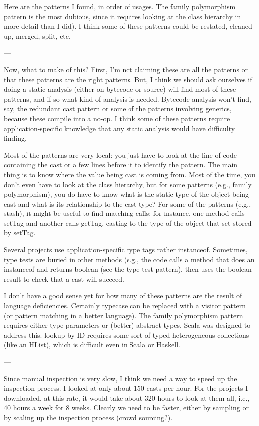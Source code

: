 Here are the patterns I found, in order of usages. 
The family polymorphism pattern is the most dubious, since it requires looking at the class hierarchy in more detail than I did). 
I think some of these patterns could be restated, cleaned up, merged, split, etc. 

--- 

Now, what to make of this? 
First, I'm not claiming these are all the patterns or that these patterns are the right patterns. 
But, I think we should ask ourselves if doing a static analysis (either on bytecode or source) will find most of these patterns, and if so what kind of analysis is needed. 
Bytecode analysis won't find, say, the redundant cast pattern or some of the patterns involving generics, because these compile into a no-op. 
I think some of these patterns require application-specific knowledge that any static analysis would have difficulty finding. 

Most of the patterns are very local: 
you just have to look at the line of code containing the cast or a few lines before it to identify the pattern. 
The main thing is to know where the value being cast is coming from. 
Most of the time, you don't even have to look at the class hierarchy, but for some patterns (e.g., family polymorphism), you do have to know what is the static type of the object being cast and what is its relationship to the cast type? 
For some of the patterns (e.g., stash), it might be useful to find matching calls: 
for instance, one method calls setTag and another calls getTag, casting to the type of the object that set stored by setTag. 

Several projects use application-specific type tags rather instanceof. 
Sometimes, type tests are buried in other methods (e.g., the code calls a method that does an instanceof and returns boolean (see the type test pattern), then uses the boolean result to check that a cast will succeed. 

I don't have a good sense yet for how many of these patterns are the result of language deficiencies. 
Certainly typecase can be replaced with a visitor pattern (or pattern matching in a better language). 
The family polymorphism pattern requires either type parameters or (better) abstract types. 
Scala was designed to address this. 
lookup by ID requires some sort of typed heterogeneous collections (like an HList), which is difficult even in Scala or Haskell. 

--- 

Since manual inspection is very slow, I think we need a way to speed up the inspection process. 
I looked at only about 150 casts per hour. 
For the projects I downloaded, at this rate, it would take about 320 hours to look at them all, i.e., 40 hours a week for 8 weeks. 
Clearly we need to be faster, either by sampling or by scaling up the inspection process (crowd sourcing?). 

